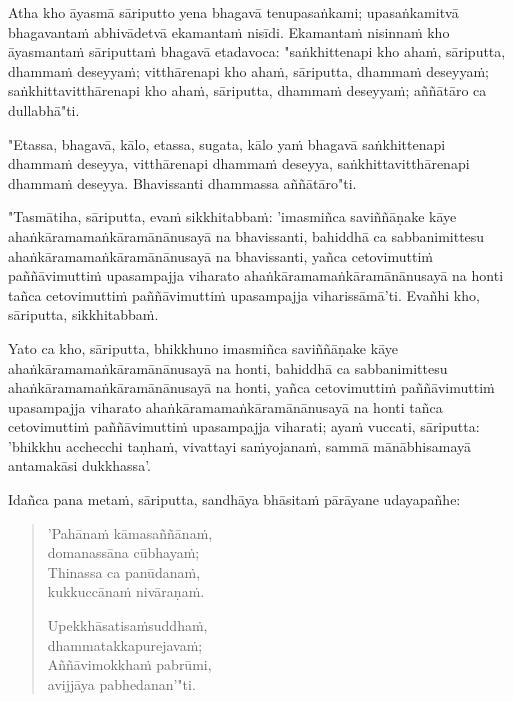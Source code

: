 \vfill\eject

Atha kho āyasmā sāriputto yena bhagavā tenupasaṅkami; upasaṅkamitvā bhagavantaṁ abhivādetvā ekamantaṁ nisīdi. Ekamantaṁ nisinnaṁ kho āyasmantaṁ sāriputtaṁ bhagavā etadavoca: "saṅkhittenapi kho ahaṁ, sāriputta, dhammaṁ deseyyaṁ; vitthārenapi kho ahaṁ, sāriputta, dhammaṁ deseyyaṁ; saṅkhittavitthārenapi kho ahaṁ, sāriputta, dhammaṁ deseyyaṁ; aññātāro ca dullabhā"ti.


"Etassa, bhagavā, kālo, etassa, sugata, kālo yaṁ bhagavā saṅkhittenapi dhammaṁ deseyya, vitthārenapi dhammaṁ deseyya, saṅkhittavitthārenapi dhammaṁ deseyya. Bhavissanti dhammassa aññātāro"ti.


"Tasmātiha, sāriputta, evaṁ sikkhitabbaṁ: 'imasmiñca saviññāṇake kāye ahaṅkāramamaṅkāramānānusayā na bhavissanti, bahiddhā ca sabbanimittesu ahaṅkāramamaṅkāramānānusayā na bhavissanti, yañca cetovimuttiṁ paññāvimuttiṁ upasampajja viharato ahaṅkāramamaṅkāramānānusayā na honti tañca cetovimuttiṁ paññāvimuttiṁ upasampajja viharissāmā’ti. Evañhi kho, sāriputta, sikkhitabbaṁ.


Yato ca kho, sāriputta, bhikkhuno imasmiñca saviññāṇake kāye ahaṅkāramamaṅkāramānānusayā na honti, bahiddhā ca sabbanimittesu ahaṅkāramamaṅkāramānānusayā na honti, yañca cetovimuttiṁ paññāvimuttiṁ upasampajja viharato ahaṅkāramamaṅkāramānānusayā na honti tañca cetovimuttiṁ paññāvimuttiṁ upasampajja viharati; ayaṁ vuccati, sāriputta: 'bhikkhu acchecchi taṇhaṁ, vivattayi saṁyojanaṁ, sammā mānābhisamayā antamakāsi dukkhassa'.


Idañca pana metaṁ, sāriputta, sandhāya bhāsitaṁ pārāyane udayapañhe:


\begin{quotation}
'Pahānaṁ kāmasaññānaṁ, \\
domanassāna cūbhayaṁ; \\
Thinassa ca panūdanaṁ, \\
kukkuccānaṁ nivāraṇaṁ.


Upekkhāsatisaṁsuddhaṁ, \\
dhammatakkapurejavaṁ; \\
Aññāvimokkhaṁ pabrūmi, \\
avijjāya pabhedanan'"ti.


\end{quotation}

